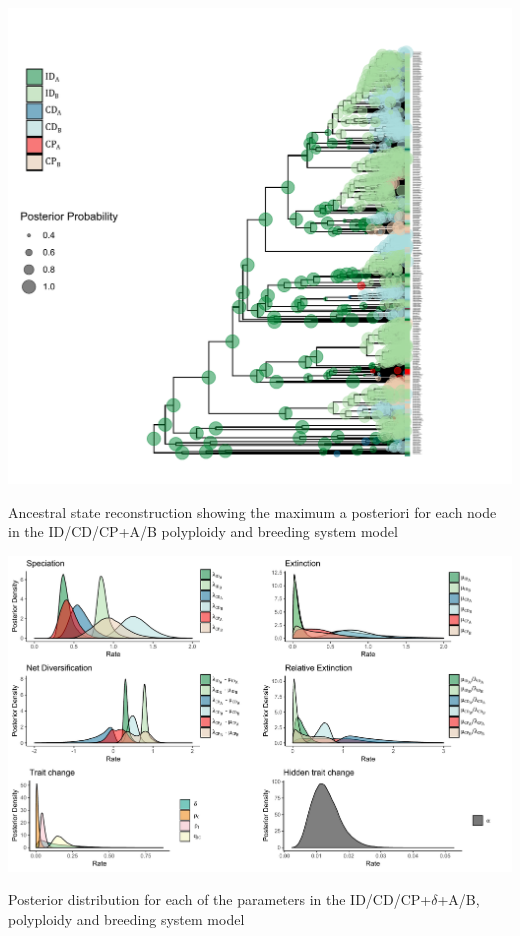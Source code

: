 \begin{suppfigure}
\includegraphics[width=\textwidth]{asrIDCDCPAB.pdf}
\caption{Ancestral state reconstruction showing the maximum a posteriori for each node in the ID/CD/CP+A/B polyploidy and breeding system model} %
\label{suppfigure:IDCDCPnodipABasr}
\end{suppfigure}

\begin{suppfigure}
\includegraphics[width=\textwidth]{muhisseDPSIposteriordist.pdf}
\caption{Posterior distribution for each of the parameters in the ID/CD/CP+$\delta$+A/B, polyploidy and breeding system model} %
\label{suppfigure:IDCDCPAB}
\end{suppfigure}

